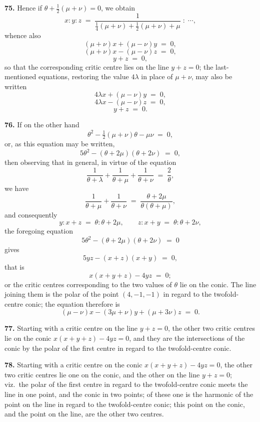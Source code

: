 \documentclass[11pt,a4paper]{article}
\begin{document}
\medskip

\textbf{75.} Hence if $\theta + \tfrac{1}{2}(\mu+\nu) = 0$, we obtain
\[
x:y:z \;=\; \frac{1}{\tfrac{1}{4}(\mu+\nu)+\tfrac{1}{2}(\mu+\nu)+\mu} \;:\; \cdots,
\]
whence also
\[
(\mu+\nu)x + (\mu-\nu)y \;=\; 0,
\]
\[
(\mu+\nu)x - (\mu-\nu)z \;=\; 0,
\]
\[
y+z \;=\; 0,
\]
so that the corresponding critic centre lies on the line $y+z=0$; the last-mentioned equations, restoring the value $4\lambda$ in place of $\mu+\nu$, may also be written
\[
4\lambda x + (\mu-\nu)y \;=\; 0,
\]
\[
4\lambda x - (\mu-\nu)z \;=\; 0,
\]
\[
y+z \;=\; 0.
\]

\medskip

\textbf{76.} If on the other hand
\[
\theta^{2}-\tfrac{1}{2}(\mu+\nu)\theta-\mu\nu \;=\; 0,
\]
or, as this equation may be written,
\[
5\theta^{2}-(\theta+2\mu)(\theta+2\nu) \;=\; 0,
\]
then observing that in general, in virtue of the equation
\[
\frac{1}{\theta+\lambda}+\frac{1}{\theta+\mu}+\frac{1}{\theta+\nu} \;=\; \frac{2}{\theta},
\]
we have
\[
\frac{1}{\theta+\mu} + \frac{1}{\theta+\nu} \;=\; \frac{\theta+2\mu}{\theta(\theta+\mu)},
\]
and consequently
\[
y : x+z \;=\; \theta : \theta+2\mu,\qquad z : x+y \;=\; \theta : \theta+2\nu,
\]
the foregoing equation
\[
5\theta^{2}-(\theta+2\mu)(\theta+2\nu) \;=\; 0
\]
gives
\[
5yz - (x+z)(x+y) \;=\; 0,
\]
that is
\[
x(x+y+z) - 4yz \;=\; 0;
\]
or the critic centres corresponding to the two values of $\theta$ lie on the conic. The line joining them is the polar of the point $(4,-1,-1)$ in regard to the twofold-centre conic; the equation therefore is
\[
(\mu-\nu)x - (3\mu+\nu)y + (\mu+3\nu)z \;=\; 0.
\]

\medskip

\textbf{77.} Starting with a critic centre on the line $y+z=0$, the other two critic centres lie on the conic $x(x+y+z)-4yz=0$, and they are the intersections of the conic by the polar of the first centre in regard to the twofold-centre conic.

\medskip

\textbf{78.} Starting with a critic centre on the conic $x(x+y+z)-4yz=0$, the other two critic centres lie one on the conic, and the other on the line $y+z=0$; viz.\ the polar of the first centre in regard to the twofold-centre conic meets the line in one point, and the conic in two points; of these one is the harmonic of the point on the line in regard to the twofold-centre conic; this point on the conic, and the point on the line, are the other two centres.

\medskip
\end{document}
